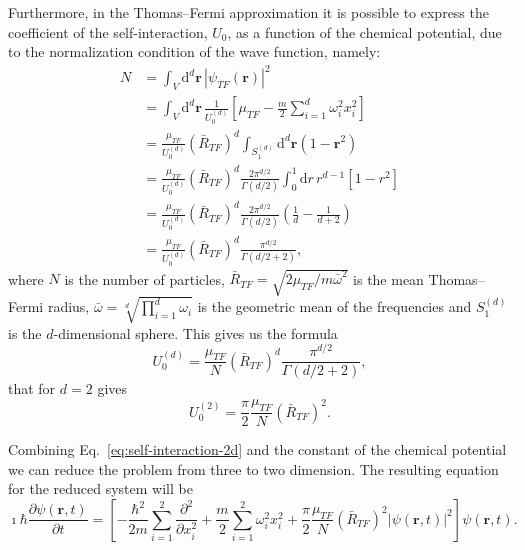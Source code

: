 Furthermore, in the Thomas--Fermi approximation it is possible to express the coefficient of the self-interaction, $U_0$, as a function of the chemical potential, due to the normalization condition of the wave function, namely:
\begin{equation}
\begin{split}
N & = \int_V \mathrm{d}^d \textbf{r} \, |\psi_{TF}(\textbf{r})|^2 \\
& = \int_V \mathrm{d}^d \textbf{r} \, \frac{1}{U_0^{(d)}} \left[ \mu_{TF} - \frac{m}{2} \sum_{i=1}^d \omega_i^2 x_i^2 \right] \\
& = \frac{\mu_{TF}}{U_0^{(d)}} \left( \bar{R}_{TF} \right)^d \int_{S_1^{(d)}} \mathrm{d}^d \textbf{r} (1 - \textbf{r}^2) \\ 
& = \frac{\mu_{TF}}{U_0^{(d)}} \left( \bar{R}_{TF} \right)^d \frac{2\pi^{d/2}}{\Gamma(d/2)} \int_0^1 \mathrm{d}r \, r^{d-1} [1 - r^2] \\
& = \frac{\mu_{TF}}{U_0^{(d)}} \left( \bar{R}_{TF} \right)^d \frac{2\pi^{d/2}}{\Gamma(d/2)} \left( \frac{1}{d} - \frac{1}{d+2} \right) \\
& = \frac{\mu_{TF}}{U_0^{(d)}} \left( \bar{R}_{TF} \right)^d \frac{\pi^{d/2}}{\Gamma(d/2 + 2)},
\end{split}
\end{equation}
where $N$ is the number of particles, $\bar{R}_{TF} = \sqrt{2\mu_{TF} / m \bar{\omega}^2}$ is the mean Thomas--Fermi radius, $\bar{\omega} = \sqrt[d]{\prod_{i=1}^d \omega_i}$ is the geometric mean of the frequencies and $S_1^{(d)}$ is the $d$-dimensional sphere.
This gives us the formula
\begin{equation}
U_0^{(d)} = \frac{\mu_{TF}}{N} \left( \bar{R}_{TF} \right)^d \frac{\pi^{d/2}}{\Gamma(d/2 + 2)},
\end{equation}
that for $d=2$ gives
\begin{equation} \label{eq:self-interaction-2d}
U_0^{(2)} = \frac{\pi}{2} \frac{\mu_{TF}}{N} \left( \bar{R}_{TF} \right)^2.
\end{equation}

Combining Eq.~\eqref{eq:self-interaction-2d} and the constant of the chemical potential we can reduce the problem from three to two dimension. The resulting equation for the reduced system will be
\begin{equation}
\imath \hbar \frac{\partial \psi(\textbf{r}, t)}{\partial t} = \left[ - \frac{\hbar^2}{2m} \sum_{i=1}^2 \frac{\partial^2}{\partial x_i^2} + \frac{m}{2} \sum_{i=1}^2 \omega_i^2 x_i^2 + \frac{\pi}{2} \frac{\mu_{TF}}{N} \left( \bar{R}_{TF} \right)^2 |\psi(\textbf{r}, t)|^2 \right] \psi(\textbf{r}, t). \nonumber
\end{equation}